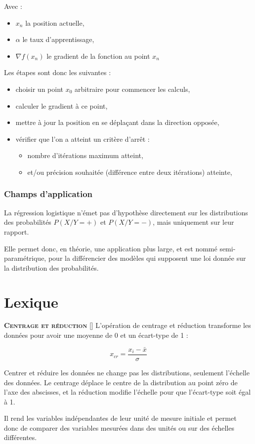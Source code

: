 \documentclass[10pt,french]{report}
\newcommand{\entreelex}[3][]{%
	{\large \textbf{\textsc{#2}}} %
	\if\relax\detokenize{#1}\relax %
	\else %
	\raisebox{0.15ex}{\scalebox{0.7}{$\Diamond$}} %
	[#1] %
	\fi
	\raisebox{0.13ex}{\scalebox{0.75}{$\blacksquare$}} #3 %
}
\begin{document}
    Avec :
    \begin{itemize}
        \item $x_n$ la position actuelle,
        \item $\alpha$ le taux d'apprentissage,
        \item $\nabla f\left(x_n\right)$ le gradient de la fonction au point $x_n$
    \end{itemize}

    Les étapes sont donc les suivantes :
    \begin{itemize}
        \item choisir un point $x_0$ arbitraire pour commencer les calculs,
        \item calculer le gradient à ce point,
        \item mettre à jour la position en se déplaçant dans la direction opposée,
        \item vérifier que l'on a atteint un critère d'arrêt :
        \begin{itemize}
            \item nombre d'itérations maximum atteint,
            \item et/ou précision souhaitée (différence entre deux itérations) atteinte,
        \end{itemize}
    \end{itemize}

	\subsection{Champs d'application}

    La régression logistique n'émet pas d'hypothèse directement sur les distributions des probabilités $P\left(X/Y=+\right)$ et $P\left(X/Y=-\right)$, mais uniquement sur leur rapport.

    Elle permet donc, en théorie, une application plus large, et est nommé semi-paramétrique, pour la différencier des modèles qui supposent une loi donnée sur la distribution des probabilités.


	\chapter{Lexique}
	
	\label{Centrage et réduction}
	\entreelex{Centrage et réduction}{L'opération de centrage et réduction transforme les données pour avoir une moyenne de 0 et un écart-type de 1 :
		
	\begin{equation}
		x_{cr}=\frac{x_{i}-\bar{x}}{\sigma}
	\end{equation}
		
	 Centrer et réduire les données ne change pas les distributions, seulement l'échelle des données. Le centrage déplace le centre de la distribution au point zéro de l'axe des abscisses, et la réduction modifie l'échelle pour que l'écart-type soit égal à 1.
	 
	 Il rend les variables indépendantes de leur unité de mesure initiale et permet donc de comparer des variables mesurées dans des unités ou sur des échelles différentes.}
	 
\end{document}
